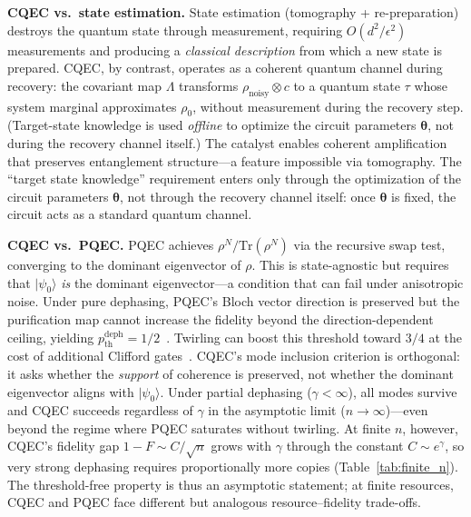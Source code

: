 \documentclass[pra,twocolumn,superscriptaddress,longbibliography,floatfix]{revtex4-2}
\begin{document}
\textbf{CQEC vs.\ state estimation.}
State estimation (tomography + re-preparation) destroys the quantum state through measurement, requiring $O(d^2/\epsilon^2)$ measurements and producing a \emph{classical description} from which a new state is prepared.
CQEC, by contrast, operates as a coherent quantum channel during recovery: the covariant map $\Lambda$ transforms $\rho_\mathrm{noisy} \otimes c$ to a quantum state $\tau$ whose system marginal approximates $\rho_0$, without measurement during the recovery step.
(Target-state knowledge is used \emph{offline} to optimize the circuit parameters $\boldsymbol{\theta}$, not during the recovery channel itself.)
The catalyst enables coherent amplification that preserves entanglement structure---a feature impossible via tomography.
The ``target state knowledge'' requirement enters only through the optimization of the circuit parameters $\boldsymbol{\theta}$, not through the recovery channel itself: once $\boldsymbol{\theta}$ is fixed, the circuit acts as a standard quantum channel.

\textbf{CQEC vs.\ PQEC.}
PQEC achieves $\rho^N / \mathrm{Tr}(\rho^N)$ via the recursive swap test, converging to the dominant eigenvector of $\rho$.
This is state-agnostic but requires that $|\psi_0\rangle$ \emph{is} the dominant eigenvector---a condition that can fail under anisotropic noise.
Under pure dephasing, PQEC's Bloch vector direction is preserved but the purification map cannot increase the fidelity beyond the direction-dependent ceiling, yielding $p_\mathrm{th}^\mathrm{deph} = 1/2$~\cite{Raghoonanan2026}.
Twirling can boost this threshold toward $3/4$ at the cost of additional Clifford gates~\cite{Raghoonanan2026}.
CQEC's mode inclusion criterion is orthogonal: it asks whether the \emph{support} of coherence is preserved, not whether the dominant eigenvector aligns with $|\psi_0\rangle$.
Under partial dephasing ($\gamma < \infty$), all modes survive and CQEC succeeds regardless of $\gamma$ in the asymptotic limit ($n \to \infty$)---even beyond the regime where PQEC saturates without twirling.
At finite $n$, however, CQEC's fidelity gap $1 - F \sim C/\sqrt{n}$ grows with $\gamma$ through the constant $C \sim e^\gamma$, so very strong dephasing requires proportionally more copies (Table~\ref{tab:finite_n}).
The threshold-free property is thus an asymptotic statement; at finite resources, CQEC and PQEC face different but analogous resource--fidelity trade-offs.
\end{document}
